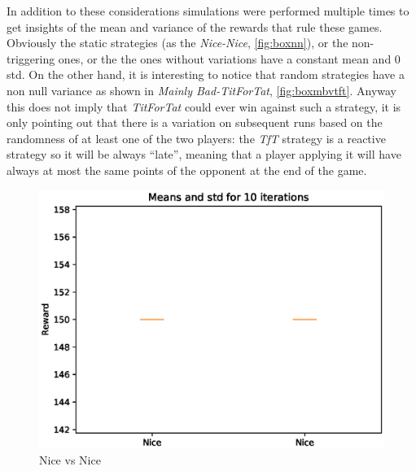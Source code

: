 \documentclass[journal,a4paper,10pt,twoside]{IEEEtran} %
\begin{document}
In addition to these considerations simulations were performed multiple times to get insights of the mean and variance of the rewards that rule these games. Obviously the static strategies (as the \textit{Nice-Nice}, \autoref{fig:boxnn}), or the non-triggering ones, or the the ones without variations have a constant mean and $0$ std. On the other hand, it is interesting to notice that random strategies have a non null variance as shown in \textit{Mainly Bad-TitForTat}, \autoref{fig:boxmbvtft}. Anyway this does not imply that \textit{TitForTat} could ever win against such a strategy, it is only pointing out that there is a variation on subsequent runs based on the randomness of at least one of the two players: the \textit{TfT} strategy is a reactive strategy so it will be always ``late'', meaning that a player applying it will have always at most the same points of the opponent at the end of the game.

\begin{figure}[!ht]
    \centering
    \includegraphics[width=1\columnwidth]{../img/ipd2p/ipd2p-boxplot-Nice-Nice}
    \caption{Nice vs Nice}
    \label{fig:boxnn}
\end{figure}
\end{document}
